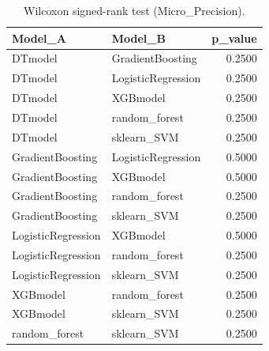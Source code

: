 \begin{table}[t]
\centering
\begin{tabular}{llr}
\toprule
Model_A & Model_B & p_value \\
\midrule
DTmodel & GradientBoosting & 0.2500 \\
DTmodel & LogisticRegression & 0.2500 \\
DTmodel & XGBmodel & 0.2500 \\
DTmodel & random_forest & 0.2500 \\
DTmodel & sklearn_SVM & 0.2500 \\
GradientBoosting & LogisticRegression & 0.5000 \\
GradientBoosting & XGBmodel & 0.5000 \\
GradientBoosting & random_forest & 0.2500 \\
GradientBoosting & sklearn_SVM & 0.2500 \\
LogisticRegression & XGBmodel & 0.5000 \\
LogisticRegression & random_forest & 0.2500 \\
LogisticRegression & sklearn_SVM & 0.2500 \\
XGBmodel & random_forest & 0.2500 \\
XGBmodel & sklearn_SVM & 0.2500 \\
random_forest & sklearn_SVM & 0.2500 \\
\bottomrule
\end{tabular}
\caption{Wilcoxon signed-rank test (Micro_Precision).}
\label{tab:wilcoxon_Micro_Precision}
\end{table}